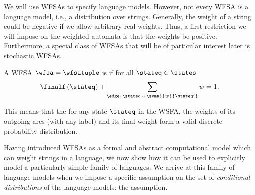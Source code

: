 We will use WFSAs to specify language models.
However, not every WFSA is a language model, i.e., a distribution over strings.
Generally, the weight of a string could be negative if we allow arbitrary real weights.
Thus, a first restriction we will impose on the weighted automata is that the weights be positive. 
Furthermore, a special class of WFSAs that will be of particular interest later is stochastic WFSAs.
\begin{definition}\label{def:stochastic-wfsa}
A WFSA $\wfsa = \wfsatuple$ is  if for all $\stateq \in \states$
\begin{equation}
    \finalf\left(\stateq\right) + \sum_{\edge{\stateq}{\syma}{w}{\stateq'}} w = 1.
\end{equation}
\end{definition}
This means that the for any state $\stateq$ in the WSFA, the weights of its outgoing arcs (with any label) and its final weight form a valid discrete probability distribution.

Having introduced WFSAs as a formal and abstract computational model which can weight strings in a language, we now show how it can be used to explicitly model a particularly simple family of languages.
We arrive at this family of language models when we impose a specific assumption on the set of \emph{conditional distributions} of the language models: the \ngram{} assumption.

